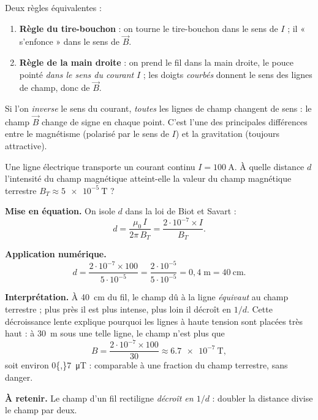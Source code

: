 \documentclass[11pt,a4paper]{article}
\newcommand{\Bvec}{\vec{B}}
\begin{document}
\begin{methode}[déterminer le SENS de $\Bvec$ autour d'un fil]
Deux règles équivalentes :
\begin{enumerate}[leftmargin=1.6em,topsep=2pt,itemsep=1pt]
  \item \textbf{Règle du tire-bouchon} : on tourne le tire-bouchon dans le sens de $I$ ; il
        « s'enfonce » dans le sens de $\Bvec$.
  \item \textbf{Règle de la main droite} : on prend le fil dans la main droite, le pouce pointé
        \emph{dans le sens du courant} $I$ ; les doigts \emph{courbés} donnent le sens des lignes
        de champ, donc de $\Bvec$.
\end{enumerate}
\end{methode}

\begin{attention}
Si l'on \emph{inverse} le sens du courant, \emph{toutes} les lignes de champ changent de sens :
le champ $\Bvec$ change de signe en chaque point. C'est l'une des principales différences entre le
magnétisme (polarisé par le sens de $I$) et la gravitation (toujours attractive).
\end{attention}

\begin{exemple}
Une ligne électrique transporte un courant continu $I=\SI{100}{\ampere}$. À quelle distance $d$
l'intensité du champ magnétique atteint-elle la valeur du champ magnétique terrestre
$B_T \approx \SI{5e-5}{\tesla}$ ?

\smallskip
\textbf{Mise en équation.} On isole $d$ dans la loi de Biot et Savart :
\[ d = \dfrac{\mu_0\, I}{2\pi\, B_T} = \dfrac{2\cdot 10^{-7}\times I}{B_T}. \]

\textbf{Application numérique.}
\[ d = \dfrac{2\cdot 10^{-7}\times 100}{5\cdot 10^{-5}}
     = \dfrac{2\cdot 10^{-5}}{5\cdot 10^{-5}} = 0{,}4\;\text{m} = \SI{40}{\centi\metre}. \]

\textbf{Interprétation.} À \SI{40}{\centi\metre} du fil, le champ dû à la ligne \emph{équivaut} au
champ terrestre ; plus près il est plus intense, plus loin il décroît en $1/d$. Cette décroissance
lente explique pourquoi les lignes à haute tension sont placées très haut : à \SI{30}{\metre} sous
une telle ligne, le champ n'est plus que
\[ B = \dfrac{2\cdot 10^{-7}\times 100}{30} \approx \SI{6.7e-7}{\tesla}, \]
soit environ \SI{0{,}7}{\micro\tesla} : comparable à une fraction du champ terrestre, sans danger.

\textbf{À retenir.} Le champ d'un fil rectiligne \emph{décroît en $1/d$} : doubler la distance
divise le champ par deux.
\end{exemple}
\end{document}
